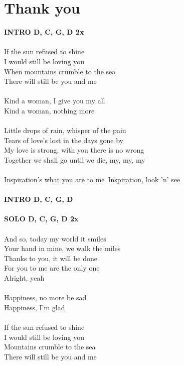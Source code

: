 \section{Thank you}
\footnotesize\textbf{INTRO D, C, G, D 2x}\\
\normalsize
\\
If the sun refused to shine\\
I would still be loving you\\
When mountains crumble to the sea\\
There will still be you and me\\
\\
Kind a woman, I give you my all\\
Kind a woman, nothing more\\
\\
Little drops of rain, whisper of the pain\\
Tears of love's lost in the days gone by\\
My love is strong, with you there is no wrong\\
Together we shall go until we die, my, my, my\\
\\
Inspiration's what you are to me\
Inspiration, look 'n' see\\
\\
\footnotesize\textbf{INTRO D, C, G, D}\\
\\
\textbf{SOLO D, C, G, D 2x}\\
\normalsize
\\
And so, today my world it smiles\\
Your hand in mine, \ch{D}we walk the miles\\
Thanks to you, it will be done\\
For you to me are the only one\\
Alright, yeah\\
\\
Happiness, no more be sad\\
\ch{Hmi}Happiness, \ch{E}I'm glad\\
\\
If the sun refused to shine\\
I would still be \ch{D}loving you\\
Mountains crumble to the sea\\
There will still be you and me\\